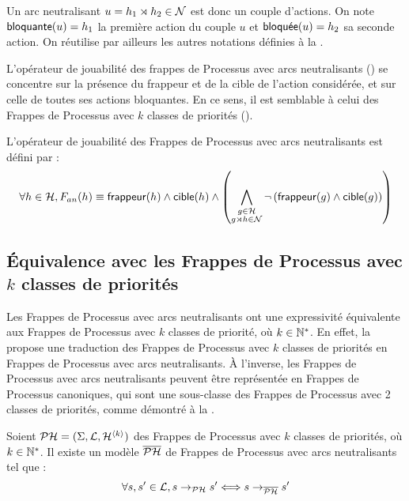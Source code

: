 Un arc neutralisant $u = h_1\rtimes h_2 \in \mathcal{N}$ est donc un couple d'actions.
On note $\mathsf{bloquante}(u) = h_1$ la première action du couple $u$
et $\mathsf{bloqu\acute{e}e}(u) = h_2$ sa seconde action.
On réutilise par ailleurs les autres notations définies à la .

L'opérateur de jouabilité des frappes de Processus avec arcs neutralisants ()
se concentre sur la présence du frappeur et de la cible de l'action considérée,
et sur celle de toutes ses actions bloquantes.
En ce sens, il est semblable à celui des Frappes de Processus avec $k$ classes de priorités
().

\begin{definition}
  L'opérateur de jouabilité des Frappes de Processus avec arcs neutralisants est défini par :
  \[\forall h \in \mathcal{H}, F_{an}(h) \equiv \mathsf{frappeur}(h) \wedge \mathsf{cible}(h) \wedge
    \left( \bigwedge_{\substack{g \in \mathcal{H}\\g\rtimes h \in \mathcal{N}}}
    \neg \left( \mathsf{frappeur}(g) \wedge \mathsf{cible}(g) \right) \right)\]
\end{definition}



\subsection{Équivalence avec les Frappes de Processus avec $k$ classes de priorités}

Les Frappes de Processus avec arcs neutralisants ont une expressivité équivalente
aux Frappes de Processus avec $k$ classes de priorité, où $k \in \mathbb{N}^*$.
En effet, la  propose une traduction des Frappes de Processus
avec $k$ classes de priorités en Frappes de Processus avec arcs neutralisants.
À l'inverse, les Frappes de Processus avec arcs neutralisants peuvent être représentée
en Frappes de Processus canoniques, qui sont une sous-classe des Frappes de Processus avec
2 classes de priorités, comme démontré à la .

\begin{theorem}
  Soient $\mathcal{PH} = (\Sigma, \mathcal{L}, \mathcal{H}^{{\langle k \rangle}})$ des Frappes de Processus avec $k$ classes
  de priorités, où $k \in \mathbb{N}^*$.
  Il existe un modèle $\overline{\mathcal{PH}}$ de Frappes de Processus avec arcs neutralisants tel que :
  \[\forall s, s' \in \mathcal{L}, s \rightarrow_{\mathcal{PH}} s' \Longleftrightarrow s \rightarrow_{\overline{\mathcal{PH}}} s' \]
\end{theorem}


